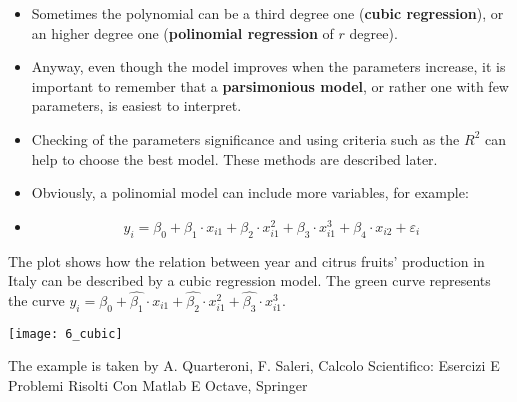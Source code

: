 \begin{frame}
  \vspace{0.25cm}
  \begin{itemize}
    \item Sometimes the polynomial can be a third degree one (\textbf{cubic regression}), or an higher degree one (\textbf{polinomial regression} of $ r $ degree).
    \vspace{0.15cm}
    \item Anyway, even though the model improves when the parameters increase, it is important to remember that a \textbf{parsimonious model}, or rather one with few parameters, is easiest to interpret.
    \vspace{0.15cm}
    \item Checking of the parameters significance and using criteria such as the $ R^2 $ can help to choose the best model. These methods are described later.
    \vspace{0.15cm}
    \item Obviously, a polinomial model can include more variables, for example:
    \item[] \vspace{-0.6cm} $$ y_i = \beta_0 + \beta_1 \cdot x_{i1} + \beta_2 \cdot x_{i1}^2 + \beta_3 \cdot x_{i1}^3 + \beta_4 \cdot x_{i2} + \varepsilon_i $$ \vspace{-0.8cm}
  \end{itemize}
\end{frame}

\begin{frame}
  The plot shows how the relation between year and citrus fruits' production in Italy can be described by a cubic regression model. The green curve represents the curve $ y_i = \hat{\beta_0} + \hat{\beta_1} \cdot x_{i1} + \hat{\beta_2} \cdot x_{i1}^2 + \hat{\beta_3} \cdot x_{i1}^3 $. 
  \begin{center}
    \texttt{[image: 6\_cubic]}
  \end{center}
  \vspace{-0.3cm}
  \begin{tiny}
    The example is taken by A. Quarteroni, F. Saleri, Calcolo Scientifico: Esercizi E Problemi Risolti Con Matlab E Octave, Springer
  \end{tiny}
\end{frame}



